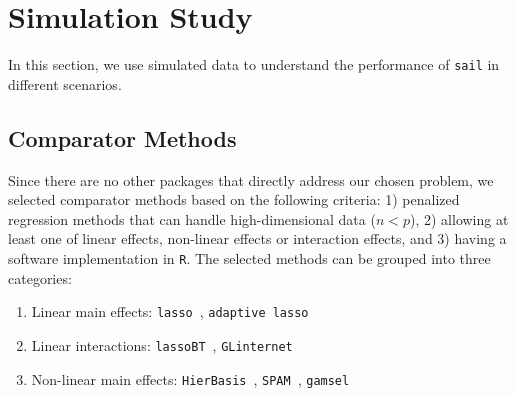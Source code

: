 \documentclass[a4paper,fleqn]{cas-sc}
\newtheorem{proposition}{Proposition}
\begin{document}

\section{Simulation Study} \label{sec:sail_simulation}
In this section, we use simulated data to understand the performance of  \texttt{sail} in different scenarios.

\subsection{Comparator Methods}

Since there are no other packages that directly address our chosen problem, we selected comparator methods based on the following criteria: 1) penalized regression methods that can handle high-dimensional data ($n<p$), 2) allowing at least one of linear effects, non-linear effects or interaction effects, and 3) having a software implementation in \texttt{R}. The selected methods can be grouped into three categories:
\begin{enumerate}
	\item Linear main effects: \texttt{lasso}~\citep{tibshirani1996regression}, \texttt{adaptive lasso}~\citep{zou2006adaptive}
	\item Linear interactions: \texttt{lassoBT}~\citep{shah2016modelling}, \texttt{GLinternet}~\citep{lim2015learning}
	\item Non-linear main effects: \texttt{HierBasis}~\citep{haris2016nonparametric}, \texttt{SPAM}~\citep{ravikumar2009sparse}, \texttt{gamsel}~\citep{chouldechova2015generalized}
\end{enumerate}
\end{document}
